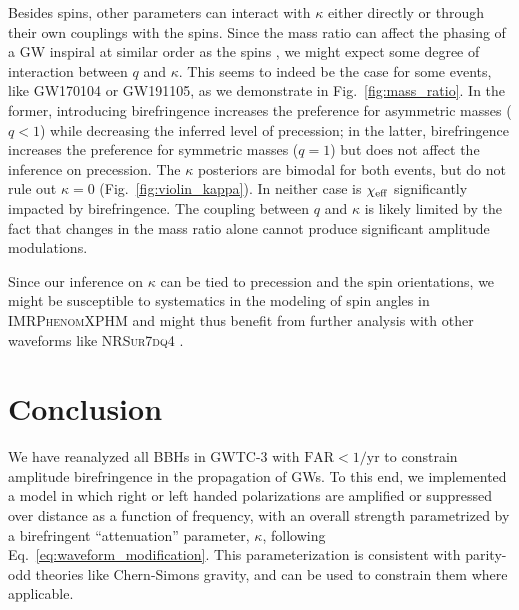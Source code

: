 \documentclass[aps,prd,twocolumn,superscriptaddress,preprintnumbers,nofootinbib]{revtex4-2}
\begin{document}
Besides spins, other parameters can interact with $\kappa$ either directly or through their own couplings with the spins.
Since the mass ratio can affect the phasing of a \ac{GW} inspiral at similar order as the spins \cite{Blanchet:2013haa}, we might expect some degree of interaction between $q$ and $\kappa$.
This seems to indeed be the case for some events, like GW170104 or GW191105, as we demonstrate in Fig.~\ref{fig:mass_ratio}.
In the former, introducing birefringence increases the preference for asymmetric masses ($q < 1$) while decreasing the inferred level of precession; in the latter, birefringence increases the preference for symmetric masses ($q = 1$) but does not affect the inference on precession.
The $\kappa$ posteriors are bimodal for both events, but do not rule out $\kappa = 0$ (Fig.~\ref{fig:violin_kappa}).
In neither case is $\chi_{\rm eff}$ significantly impacted by birefringence.
The coupling between $q$ and $\kappa$ is likely limited by the fact that changes in the mass ratio alone cannot produce significant amplitude modulations.

Since our inference on $\kappa$ can be tied to precession and the spin orientations, we might be susceptible to systematics in the modeling of spin angles in \textsc{IMRPhenomXPHM} and might thus benefit from further analysis with other waveforms like \textsc{NRSur7dq4} \cite{Varma:2018mmi}.

\section{Conclusion}
\label{sec:conclusion}

We have reanalyzed all \acp{BBH} in GWTC-3 with $\mathrm{FAR} < 1/\mathrm{yr}$ to constrain amplitude birefringence in the propagation of \acp{GW}.
To this end, we implemented a model in which right or left handed polarizations are amplified or suppressed over distance as a function of frequency, with an overall strength parametrized by a birefringent ``attenuation'' parameter, $\kappa$, following Eq.~\eqref{eq:waveform_modification}.
This parameterization is consistent with parity-odd theories like Chern-Simons gravity, and can be used to constrain them where applicable.
\end{document}

